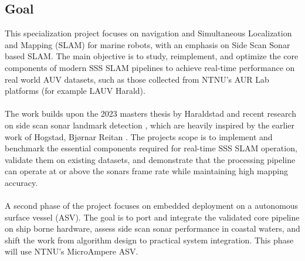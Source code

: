 \subsection{Goal}
\noindent
This specialization project focuses on navigation and Simultaneous Localization and Mapping (SLAM) for marine robots, with an emphasis on Side Scan Sonar based SLAM. The main objective is to study, reimplement, and optimize the core components of modern SSS SLAM pipelines to achieve real-time performance on real world AUV datasets, such as those collected from NTNU's AUR Lab platforms (for example LAUV Harald). 
\\ \\
The work builds upon the 2023 masters thesis by Haraldstad \cite{side_scan_sonar_master_thesis} and recent research on side scan sonar landmark detection \cite{side_scan_sonar_paper}, which are heavily inspired by the earlier work of Hogstad, Bjørnar Reitan \cite{side_scan_sonar_master_thesis_old}. The projects scope is to implement and benchmark the essential components required for real-time SSS SLAM operation, validate them on existing datasets, and demonstrate that the processing pipeline can operate at or above the sonars frame rate while maintaining high mapping accuracy.
\\ \\
A second phase of the project focuses on embedded deployment on a autonomous surface vessel (ASV). The goal is to port and integrate the validated core pipeline on ship borne hardware, assess side scan sonar performance in coastal waters, and shift the work from algorithm design to practical system integration. This phase will use NTNU's MicroAmpere ASV.



